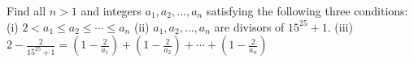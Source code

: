 Find all $n>1$ and integers $a_1,a_2,\dots,a_n$ satisfying the following three conditions:
(i) $2<a_1\le a_2\le \cdots\le a_n$
(ii) $a_1,a_2,\dots,a_n$ are divisors of $15^{25}+1$.
(iii) $2-\frac{2}{15^{25}+1}=\left(1-\frac{2}{a_1}\right)+\left(1-\frac{2}{a_2}\right)+\cdots+\left(1-\frac{2}{a_n}\right)$